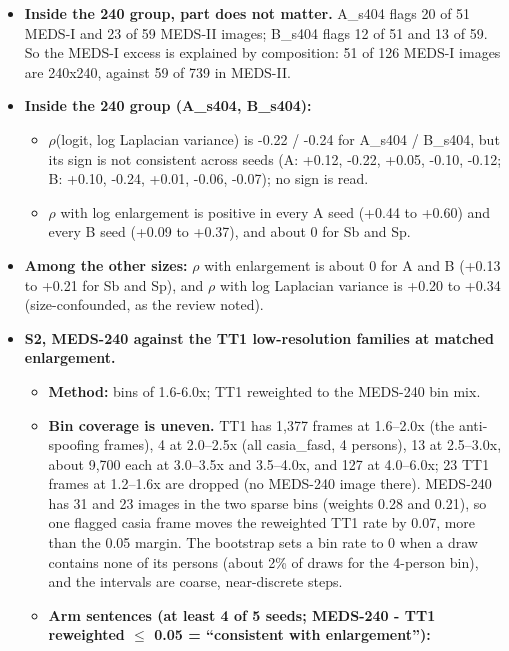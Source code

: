 \documentclass[10pt,twocolumn,letterpaper]{article}
\providecommand{\tightlist}{\setlength{\itemsep}{0pt}\setlength{\parskip}{0pt}}
\begin{document}
\begin{itemize}
\tightlist
\item
  \textbf{Inside the 240 group, part does not matter.} A\_s404 flags 20 of 51 MEDS-I and 23 of 59 MEDS-II images; B\_s404 flags 12 of 51 and 13 of 59. So the MEDS-I excess is explained by composition: 51 of 126 MEDS-I images are 240x240, against 59 of 739 in MEDS-II.
\item
  \textbf{Inside the 240 group (A\_s404, B\_s404):}

  \begin{itemize}
  \tightlist
  \item
    \(\rho\)(logit, log Laplacian variance) is -0.22 / -0.24 for A\_s404 / B\_s404, but its sign is not consistent across seeds (A: +0.12, -0.22, +0.05, -0.10, -0.12; B: +0.10, -0.24, +0.01, -0.06, -0.07); no sign is read.
  \item
    \(\rho\) with log enlargement is positive in every A seed (+0.44 to +0.60) and every B seed (+0.09 to +0.37), and about 0 for Sb and Sp.
  \end{itemize}
\item
  \textbf{Among the other sizes:} \(\rho\) with enlargement is about 0 for A and B (+0.13 to +0.21 for Sb and Sp), and \(\rho\) with log Laplacian variance is +0.20 to +0.34 (size-confounded, as the review noted).
\item
  \textbf{S2, MEDS-240 against the TT1 low-resolution families at matched enlargement.}

  \begin{itemize}
  \tightlist
  \item
    \textbf{Method:} bins of 1.6-6.0x; TT1 reweighted to the MEDS-240 bin mix.
  \item
    \textbf{Bin coverage is uneven.} TT1 has 1,377 frames at 1.6--2.0x (the anti-spoofing frames), 4 at 2.0--2.5x (all casia\_fasd, 4 persons), 13 at 2.5--3.0x, about 9,700 each at 3.0--3.5x and 3.5--4.0x, and 127 at 4.0--6.0x; 23 TT1 frames at 1.2--1.6x are dropped (no MEDS-240 image there). MEDS-240 has 31 and 23 images in the two sparse bins (weights 0.28 and 0.21), so one flagged casia frame moves the reweighted TT1 rate by 0.07, more than the 0.05 margin. The bootstrap sets a bin rate to 0 when a draw contains none of its persons (about 2\% of draws for the 4-person bin), and the intervals are coarse, near-discrete steps.
  \item
    \textbf{Arm sentences (at least 4 of 5 seeds; \textbar MEDS-240 - TT1 reweighted\textbar{} \(\le\) 0.05 = ``consistent with enlargement''):}


\end{itemize}
\end{itemize}
\end{document}
